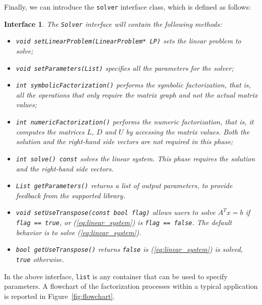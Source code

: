 \documentclass[acmtoms,acmnow]{acmtrans2m}
\newtheorem{interface}{Interface}[section]
\begin{document}
Finally, we can introduce the {\tt solver} interface class, which is defined as
follows:
\begin{interface}
\label{int:asi}
The {\tt Solver} interface
will contain the following methods:
\begin{itemize}
\item \verb!void setLinearProblem(LinearProblem* LP)! sets the linear problem
to solve;
\item \verb!void setParameters(List)! specifies all the parameters for the solver;
\item \verb!int symbolicFactorization()! performs the symbolic factorization, that
is, all the operations that only require the matrix graph and not
the actual matrix values;
\item \verb!int numericFactorization()! performs the numeric factorization, that
is, it computes the matrices $L$, $D$ and $U$ by accessing the matrix values.
Both the solution and the right-hand side vectors are not required in this phase;
\item \verb!int solve() const! solves the linear system. This phase requires the
solution and the right-hand side vectors.
\item \verb!List getParameters()! returns a list of output parameters, to
provide feedback from the supported library.
\item \verb!void setUseTranspose(const bool flag)! allows users to solve $A^T x =
b$ if \verb!flag == true!, or (\ref{eq:linear_system}) is \verb!flag == false!. The default behavior is to solve
(\ref{eq:linear_system}).
\item \verb!bool getUseTranspose()! returns \verb!false! is
(\ref{eq:linear_system}) is solved, \verb!true! otherwise.
\end{itemize}
\end{interface}
In the above interface, {\tt list} is any container that can be used
to specify parameters. A flowchart of the factorization processes
within a typical application is reported in
Figure~\ref{fig:flowchart}.
\end{document}
